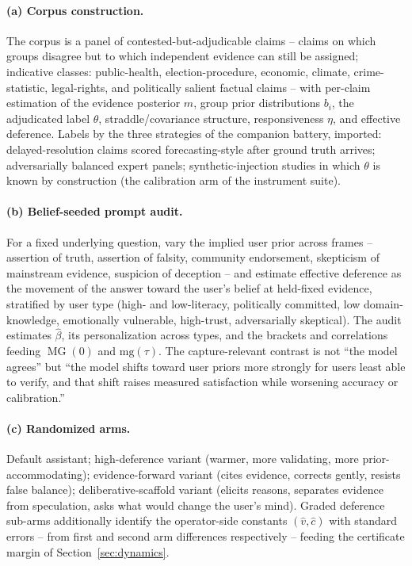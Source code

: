 \documentclass[11pt]{article}
\theoremstyle{definition}
\theoremstyle{remark}
\numberwithin{equation}{section}
\DeclareMathOperator{\MG}{MG}
\begin{document}
\paragraph{(a) Corpus construction.} The corpus is a panel of contested-but-adjudicable claims -- claims on which groups disagree but to which independent evidence can still be assigned; indicative classes: public-health, election-procedure, economic, climate, crime-statistic, legal-rights, and politically salient factual claims -- with per-claim estimation of the evidence posterior $m$, group prior distributions $b_i$, the adjudicated label $\theta$, straddle/covariance structure, responsiveness $\eta$, and effective deference. Labels by the three strategies of the companion battery, imported: delayed-resolution claims scored forecasting-style after ground truth arrives; adversarially balanced expert panels; synthetic-injection studies in which $\theta$ is known by construction (the calibration arm of the instrument suite).

\paragraph{(b) Belief-seeded prompt audit.} For a fixed underlying question, vary the implied user prior across frames -- assertion of truth, assertion of falsity, community endorsement, skepticism of mainstream evidence, suspicion of deception -- and estimate effective deference as the movement of the answer toward the user's belief at held-fixed evidence, stratified by user type (high- and low-literacy, politically committed, low domain-knowledge, emotionally vulnerable, high-trust, adversarially skeptical). The audit estimates $\hat\beta$, its personalization across types, and the brackets and correlations feeding $\MG(0)$ and $\mathrm{mg}(\tau)$. The capture-relevant contrast is not ``the model agrees'' but ``the model shifts toward user priors more strongly for users least able to verify, and that shift raises measured satisfaction while worsening accuracy or calibration.''

\paragraph{(c) Randomized arms.} Default assistant; high-deference variant (warmer, more validating, more prior-accommodating); evidence-forward variant (cites evidence, corrects gently, resists false balance); deliberative-scaffold variant (elicits reasons, separates evidence from speculation, asks what would change the user's mind). Graded deference sub-arms additionally identify the operator-side constants $(\hat v, \hat c)$ with standard errors -- from first and second arm differences respectively -- feeding the certificate margin of Section~\ref{sec:dynamics}.
\end{document}
